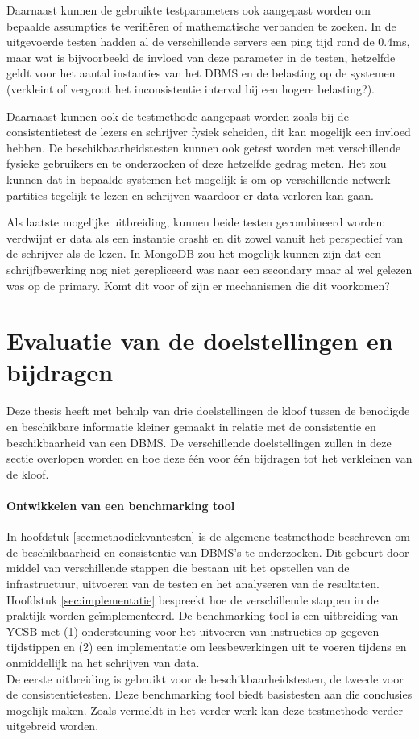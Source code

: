 Daarnaast kunnen de gebruikte testparameters ook aangepast worden om bepaalde assumpties te verifiëren of mathematische verbanden te zoeken. In de uitgevoerde testen hadden al de verschillende servers een ping tijd rond de 0.4ms, maar wat is bijvoorbeeld de invloed van deze parameter in de testen, hetzelfde geldt voor het aantal instanties van het DBMS en de belasting op de systemen (verkleint of vergroot het inconsistentie interval bij een hogere belasting?). 

Daarnaast kunnen ook de testmethode aangepast worden zoals bij de consistentietest de lezers en schrijver fysiek scheiden, dit kan mogelijk een invloed hebben. De beschikbaarheidstesten kunnen ook getest worden met verschillende fysieke gebruikers en te onderzoeken of deze hetzelfde gedrag meten. Het zou kunnen dat in bepaalde systemen het mogelijk is om op verschillende netwerk partities tegelijk te lezen en schrijven waardoor er data verloren kan gaan. 

Als laatste mogelijke uitbreiding, kunnen beide testen gecombineerd worden: verdwijnt er data als een instantie crasht en dit zowel vanuit het perspectief van de schrijver als de lezen. In MongoDB zou het mogelijk kunnen zijn dat een schrijfbewerking nog niet gerepliceerd was naar een secondary maar al wel gelezen was op de primary. Komt dit voor of zijn er mechanismen die dit voorkomen?  

\section{Evaluatie van de doelstellingen en bijdragen}
Deze thesis heeft met behulp van drie doelstellingen de kloof tussen de benodigde en beschikbare informatie kleiner gemaakt in relatie met de consistentie en beschikbaarheid van een DBMS. De verschillende doelstellingen zullen in deze sectie overlopen worden en hoe deze één voor één bijdragen tot het verkleinen van de kloof. 

\paragraph{Ontwikkelen van een benchmarking tool} In hoofdstuk \ref{sec:methodiekvantesten} is de algemene testmethode beschreven om de beschikbaarheid en consistentie van DBMS's te onderzoeken. Dit gebeurt door middel van verschillende stappen die bestaan uit het opstellen van de infrastructuur, uitvoeren van de testen en het analyseren van de resultaten. Hoofdstuk \ref{sec:implementatie} bespreekt hoe de verschillende stappen in de praktijk worden geïmplementeerd. De benchmarking tool is een uitbreiding van YCSB\cite{cooper2010benchmarking} met (1) ondersteuning voor het uitvoeren van instructies op gegeven tijdstippen en (2) een implementatie om leesbewerkingen uit te voeren tijdens en onmiddellijk na het schrijven van data. \\
De eerste uitbreiding is gebruikt voor de beschikbaarheidstesten, de tweede voor de consistentietesten. Deze benchmarking tool biedt basistesten aan die conclusies mogelijk maken. Zoals vermeldt in het verder werk kan deze testmethode verder uitgebreid worden. 

